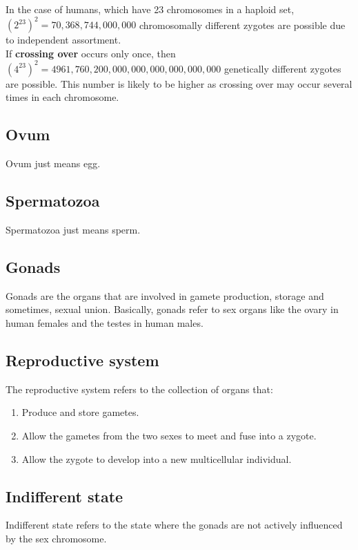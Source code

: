 \documentclass[11pt]{article}
\begin{document}
In the case of humans, which have 23 chromosomes in a haploid set, \((2^{23})^2 = 70,368,744,000,000\) chromosomally different zygotes are possible due to independent assortment.
\\[0pt]

If \textbf{crossing over} occurs only once, then \((4^{23})^2 = 4961,760,200,000,000,000,000,000,000\) genetically different zygotes are possible. This number is likely to be higher as crossing over may occur several times in each chromosome.

\subsection{Ovum}
\label{sec:org9bb0b36}
Ovum just means egg.

\subsection{Spermatozoa}
\label{sec:org6da0f57}
Spermatozoa just means sperm.

\subsection{Gonads}
\label{sec:org6476b0d}
Gonads are the organs that are involved in gamete production, storage and sometimes, sexual union. Basically, gonads refer to sex organs like the ovary in human females and the testes in human males.

\subsection{Reproductive system}
\label{sec:org4efd758}
The reproductive system refers to the collection of organs that:
\begin{enumerate}
\item Produce and store gametes.
\item Allow the gametes from the two sexes to meet and fuse into a zygote.
\item Allow the zygote to develop into a new multicellular individual.
\end{enumerate}

\subsection{Indifferent state}
\label{sec:org4b9f25d}
Indifferent state refers to the state where the gonads are not actively influenced by the sex chromosome.
\end{document}

